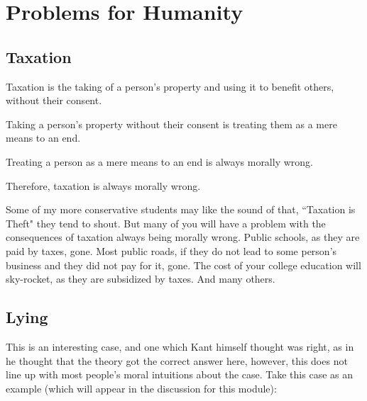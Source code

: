 \section{Problems for Humanity}
\subsection{Taxation}
\begin{earg}
    \item[] Taxation is the taking of a person’s property and using it to benefit others, without their consent.
    \item[] Taking a person’s property without their consent is treating them as a mere means to an end.
    \item[] Treating a person as a mere means to an end is always morally wrong.
    \item[] Therefore, taxation is always morally wrong.
\end{earg}
Some of my more conservative students may like the sound of that, ``Taxation is Theft" they tend to shout. But many of you will have a problem with the consequences of taxation always being morally wrong. Public schools, as they are paid by taxes, gone. Most public roads, if they do not lead to some person's business and they did not pay for it, gone. The cost of your college education will sky-rocket, as they are subsidized by taxes. And many others.
\subsection{Lying}

This is an interesting case, and one which Kant himself thought was right, as in he thought that the theory got the correct answer here, however, this does not line up with most people's moral intuitions about the case. Take this case as an example (which will appear in the discussion for this module):


